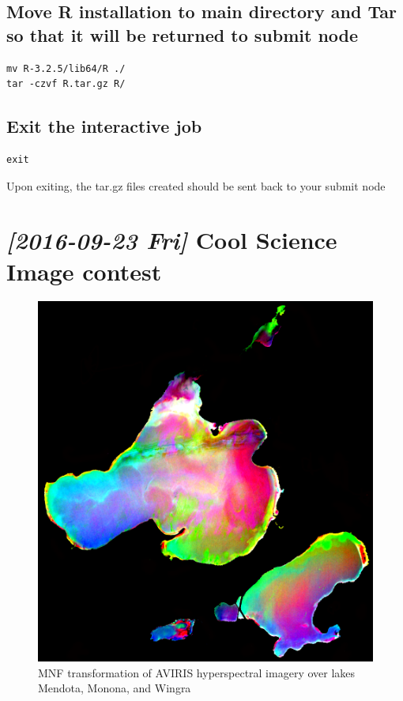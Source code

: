 \documentclass{article}
\begin{document}
\subsection*{Move R installation to main directory and Tar so that it will be returned to submit node}
\label{sec:orgbae995d}
\begin{verbatim}
mv R-3.2.5/lib64/R ./
tar -czvf R.tar.gz R/
\end{verbatim}
\subsection*{Exit the interactive job}
\label{sec:org6ed8cf9}
\begin{verbatim}
exit
\end{verbatim}

Upon exiting, the tar.gz files created should be sent back to your
submit node

\section*{\textit{[2016-09-23 Fri] } Cool Science Image contest}
\label{sec:org611cb81}
\begin{figure}[htbp]
\centering
\includegraphics[width=.9\linewidth]{blog_imgs/CoolScienceImage/beautiful_madison_lakes.png}
\caption{MNF transformation of AVIRIS hyperspectral imagery over lakes Mendota, Monona, and Wingra}
\end{figure}
\end{document}
